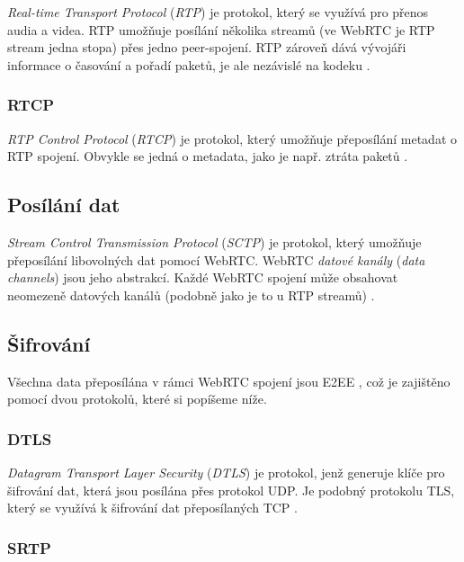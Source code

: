 \textit{Real-time Transport Protocol} (\textit{RTP}) je protokol, který se
využívá pro přenos audia a videa. RTP umožňuje posílání několika streamů (ve
WebRTC je RTP stream jedna stopa) přes jedno peer-spojení. RTP zároveň dává
vývojáři informace o časování a pořadí paketů, je ale nezávislé na kodeku
\cite{WebRTCForTheCurious}.

\subsubsection{RTCP}\label{rtcp}

\textit{RTP Control Protocol} (\textit{RTCP}) je protokol, který umožňuje
přeposílání metadat o RTP spojení. Obvykle se jedná o metadata, jako je např.
ztráta paketů \cite{WebRTCForTheCurious}.

\subsection{Posílání dat}\label{sctp}

\textit{Stream Control Transmission Protocol} (\textit{SCTP}) je protokol, který
umožňuje přeposílání libovolných dat pomocí WebRTC. WebRTC \textit{datové
    kanály} (\textit{data channels}) jsou jeho abstrakcí. Každé WebRTC spojení může
obsahovat neomezeně datových kanálů (podobně jako je to u RTP streamů)
\cite{WebRTCForTheCurious}.

\subsection{Šifrování}

Všechna data přeposílána v rámci WebRTC spojení jsou E2EE
\cite{WebRTCForTheCurious}, což je zajištěno pomocí dvou protokolů, které si
popíšeme níže.

\subsubsection{DTLS}

\textit{Datagram Transport Layer Security} (\textit{DTLS}) je protokol, jenž
generuje klíče pro šifrování dat, která jsou posílána přes protokol UDP. Je
podobný protokolu TLS, který se využívá k šifrování dat přeposílaných TCP
\cite{WebRTCForTheCurious}.

\subsubsection{SRTP}\label{srtp}

